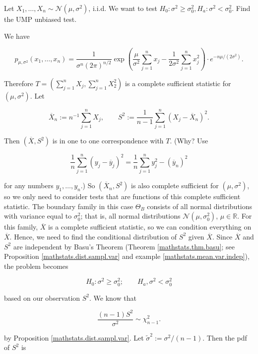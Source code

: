 \begin{example}

Let \(X_1, \ldots, X_n \sim \mathcal{N}(\mu, \sigma^2)\), i.i.d. We want to test \(H_0: \sigma^2 \geq \sigma_0^2, H_a: \sigma^2 < \sigma_0^2\). Find the UMP unbiased test.

\end{example}

\begin{solution}

We have

\[
p_{\mu, \sigma^2}(x_1, \ldots, x_n) = \frac{1}{\sigma^n (2\pi)^{n/2}} \exp \left(  \frac{\mu}{\sigma^2} \sum_{j=1}^nx_j - \frac{1}{2 \sigma^2} \sum_{j=1}^n x_j^2 \right) \cdot e^{-n\mu/ (2 \sigma^2)}.
\]

Therefore \(T = (\sum_{j=1}^n X_j, \sum_{j=1}^n X_2^2)\) is a complete sufficient statistic for \((\mu, \sigma^2)\). Let 

\[
\overline{X}_n := n^{-1} \sum_{j=1}^n X_j, \qquad S^2 := \frac{1}{n-1} \sum_{j=1}^n (X_j - \overline{X}_n)^2.
\]

Then \((\overline{X}, S^2)\) is in one to one correspondence with \(T\). (Why? Use

\[
\frac{1}{n} \sum_{j=1}^n(y_j - \overline{y}_j)^2 = \frac{1}{n} \sum_{j=1}^n y_j^2 - (\overline{y}_n)^2
\]

for any numbers \(y_1, \ldots, y_n\).) So \((\overline{X}_n, S^2)\) is also complete sufficient for \((\mu, \sigma^2)\), so we only need to consider tests that are functions of this complete sufficient statistic. The boundary family in this case \(\Theta_B\) consists of all normal distributions with variance equal to \(\sigma_0^2\); that is, all normal distributions \(\mathcal{N}(\mu, \sigma_0^2)\), \(\mu \in \mathbb{R}\). For this family, \(\overline{X}\) is a complete sufficient statistic, so we can condition everything on \(\overline{X}\). Hence, we need to find the conditional distribution of \(S^2\) given \(\overline{X}\). Since \(\overline{X}\) and \(S^2\) are independent by Basu's Theorem (Theorem \ref{mathstats.thm.basu}; see Proposition \ref{mathstats.dist.sampl.var} and example \ref{mathstats.mean.var.indep}), the problem becomes 

\[
H_0: \sigma^2 \geq \sigma_0^2; \qquad H_a, \sigma^2 < \sigma_0^2
\]

based on our observation \(S^2\). We know that 

\[
\frac{(n-1)S^2}{\sigma^2} \sim \chi_{n-1}^2.
\]

by Proposition \ref{mathstats.dist.sampl.var}. Let \(\tilde{\sigma}^2 := \sigma^2/(n-1)\). Then the pdf of \(S^2\) is 


\end{solution}
